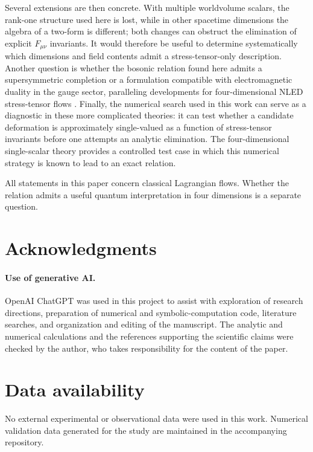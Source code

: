 \documentclass[a4paper,11pt]{article}
\numberwithin{equation}{section}
\begin{document}
Several extensions are then concrete. With multiple worldvolume scalars, the rank-one structure used here is lost, while in other spacetime dimensions the algebra of a two-form is different; both changes can obstruct the elimination of explicit $F_{\mu\nu}$ invariants. It would therefore be useful to determine systematically which dimensions and field contents admit a stress-tensor-only description. Another question is whether the bosonic relation found here admits a supersymmetric completion or a formulation compatible with electromagnetic duality in the gauge sector, paralleling developments for four-dimensional NLED stress-tensor flows \cite{Ferko2023Birefringence,Ferko2023Duality}. Finally, the numerical search used in this work can serve as a diagnostic in these more complicated theories: it can test whether a candidate deformation is approximately single-valued as a function of stress-tensor invariants before one attempts an analytic elimination. The four-dimensional single-scalar theory provides a controlled test case in which this numerical strategy is known to lead to an exact relation.

All statements in this paper concern classical Lagrangian flows. Whether the relation admits a useful quantum interpretation in four dimensions is a separate question.

\section*{Acknowledgments}

\paragraph{Use of generative AI.}
OpenAI ChatGPT was used in this project to assist with exploration of research directions, preparation of numerical and symbolic-computation code, literature searches, and organization and editing of the manuscript. The analytic and numerical calculations and the references supporting the scientific claims were checked by the author, who takes responsibility for the content of the paper.

\section*{Data availability}

No external experimental or observational data were used in this work. Numerical validation data generated for the study are maintained in the accompanying repository.
\end{document}
